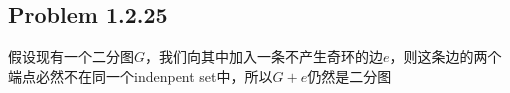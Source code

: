 \subsection*{Problem 1.2.25}
假设现有一个二分图$G$，我们向其中加入一条不产生奇环的边$e$，则这条边的两个端点必然不在同一个indenpent set中，所以$G + e$仍然是二分图

